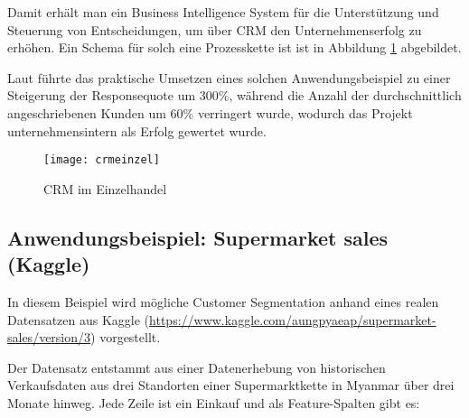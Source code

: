 Damit erhält man ein Business Intelligence System für die Unterstützung und Steuerung von Entscheidungen, um über CRM den Unternehmenserfolg zu erhöhen. Ein Schema für solch eine Prozesskette ist ist in Abbildung \ref{fig:bieinzel} abgebildet.

Laut \cite[S. 224]{biapp} führte das praktische Umsetzen eines solchen Anwendungsbeispiel zu einer Steigerung der Responsequote um 300\%, während die Anzahl der durchschnittlich angeschriebenen Kunden um 60\% verringert wurde, wodurch das Projekt unternehmensintern als Erfolg gewertet wurde.


\begin{figure}[ht]
  \centering
  \texttt{[image: crmeinzel]}
  \caption{CRM im Einzelhandel\cite[S. 220]{biapp}}
  \label{fig:bieinzel}
\end{figure}

\subsection{Anwendungsbeispiel: Supermarket sales (Kaggle)}

In diesem Beispiel wird mögliche Customer Segmentation anhand eines realen Datensatzen aus Kaggle (\url{https://www.kaggle.com/aungpyaeap/supermarket-sales/version/3}) vorgestellt.

Der Datensatz entstammt aus einer Datenerhebung von historischen Verkaufsdaten aus drei Standorten einer Supermarktkette in Myanmar  über drei Monate hinweg.
Jede Zeile ist ein Einkauf und als Feature-Spalten gibt es:


